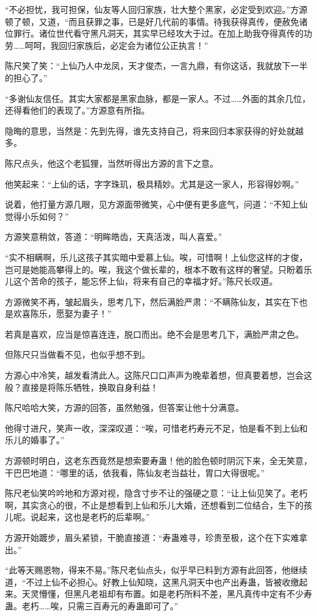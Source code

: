 \begin{this_body}
“不必担忧，我可担保，仙友等人回归家族，壮大整个黑家，必定受到欢迎。”方源顿了顿，又道，“而且获罪之事，已是好几代前的事情。待我获得真传，便赦免诸位罪行。诸位世代看守黑凡洞天，其实早已经攻大于过。在加上助我夺得真传的功劳……呵呵，我回归家族后，必定会为诸位公正执言！”

陈尺笑了笑：“上仙乃人中龙凤，天才俊杰，一言九鼎，有你这话，我就放下一半的担心了。”

“多谢仙友信任。其实大家都是黑家血脉，都是一家人。不过……外面的其余几位，还得看他们的表现了。”方源意有所指。

隐晦的意思，当然是：先到先得，谁先支持自己，将来回归本家获得的好处就越多。

陈尺点头，他这个老狐狸，当然听得出方源的言下之意。

他笑起来：“上仙的话，字字珠玑，极具精妙。尤其是这一家人，形容得妙啊。”

说着，他打量方源几眼，见方源面带微笑，心中便有更多底气，问道：“不知上仙觉得小乐如何？”

方源笑意稍敛，答道：“明眸皓齿，天真活泼，叫人喜爱。”

“实不相瞒啊，乐儿这孩子其实暗中爱慕上仙。唉，可惜啊！上仙您这样的才俊，岂可是她能高攀得上的。唉，我这个做长辈的，根本不敢有这样的奢望。只盼着乐儿这个苦命的孩子，能忘怀上仙，将来有自己的幸福才好。”陈尺长叹道。

方源微笑不再，皱起眉头，思考几下，然后满脸严肃：“不瞒陈仙友，其实在下也是欢喜陈乐，愿娶为妻子！”

若真是喜欢，应当是惊喜连连，脱口而出。绝不会是思考几下，满脸严肃之色。

但陈尺只当做看不见，也似乎想不到。

方源心中冷笑，越发看清此人。这陈尺口口声声为晚辈着想，但真要着想，岂会这般？直接是将陈乐牺牲，换取自身利益！

陈尺哈哈大笑，方源的回答，虽然勉强，但答案让他十分满意。

他得寸进尺，笑声一收，深深叹道：“唉，可惜老朽寿元不足，怕是看不到上仙和乐儿的婚事了。”

方源顿时明白，这老东西竟然是想索要寿蛊！他的脸色顿时阴沉下来，全无笑意，干巴巴地道：“哪里的话，依我看，陈仙友老当益壮，胃口大得很呢。”

陈尺老仙笑吟吟地和方源对视，隐含寸步不让的强硬之意：“让上仙见笑了。老朽啊，其实贪心的很，不止是想看到上仙和乐儿大婚，还想看到二位结合，生下的孩儿呢。说起来，这也是老朽的后辈啊。”

方源开始踱步，眉头紧锁，干脆直接道：“寿蛊难寻，珍贵至极，这个在下实难拿出。”

“此等天赐恩物，得来不易。”陈尺老仙点头，似乎早已料到方源有此回答，他继续道，“不过上仙不必担心。好教上仙知晓，这黑凡洞天中也产出寿蛊，皆被收缴起来。天灵懵懂，但黑凡老祖却有布置。如是老朽所料不差，黑凡真传中定有不少寿蛊。老朽……唉，只需三百寿元的寿蛊即可了。”


\end{this_body}

